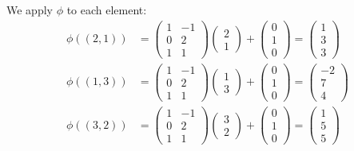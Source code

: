 \begin{example}
We apply $\phi$ to each element:
\begin{align}
\phi((2,1)) &= \begin{pmatrix} 1 & -1 \\ 0 & 2 \\ 1 & 1 \end{pmatrix} \begin{pmatrix} 2 \\ 1 \end{pmatrix} + \begin{pmatrix} 0 \\ 1 \\ 0 \end{pmatrix} = \begin{pmatrix} 1 \\ 3 \\ 3 \end{pmatrix} \\
\phi((1,3)) &= \begin{pmatrix} 1 & -1 \\ 0 & 2 \\ 1 & 1 \end{pmatrix} \begin{pmatrix} 1 \\ 3 \end{pmatrix} + \begin{pmatrix} 0 \\ 1 \\ 0 \end{pmatrix} = \begin{pmatrix} -2 \\ 7 \\ 4 \end{pmatrix} \\
\phi((3,2)) &= \begin{pmatrix} 1 & -1 \\ 0 & 2 \\ 1 & 1 \end{pmatrix} \begin{pmatrix} 3 \\ 2 \end{pmatrix} + \begin{pmatrix} 0 \\ 1 \\ 0 \end{pmatrix} = \begin{pmatrix} 1 \\ 5 \\ 5 \end{pmatrix}
\end{align}


\end{example}
